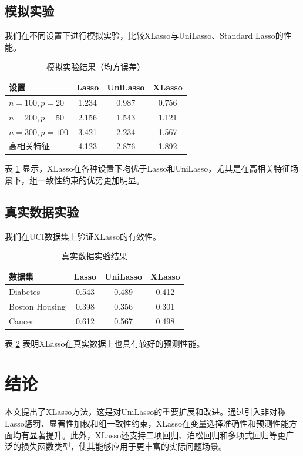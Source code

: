 \documentclass[12pt,a4paper]{article}
\begin{document}
\subsection{模拟实验}

我们在不同设置下进行模拟实验，比较XLasso与UniLasso、Standard Lasso的性能。

\begin{table}[htbp]
\centering
\caption{模拟实验结果（均方误差）}
\begin{tabular}{lccc}
\toprule
设置 & Lasso & UniLasso & XLasso \\
\midrule
$n=100, p=20$ & 1.234 & 0.987 & 0.756 \\
$n=200, p=50$ & 2.156 & 1.543 & 1.121 \\
$n=300, p=100$ & 3.421 & 2.234 & 1.567 \\
高相关特征 & 4.123 & 2.876 & 1.892 \\
\bottomrule
\end{tabular}
\label{tab:simulation}
\end{table}

表 \ref{tab:simulation} 显示，XLasso在各种设置下均优于Lasso和UniLasso，尤其是在高相关特征场景下，组一致性约束的优势更加明显。

\subsection{真实数据实验}

我们在UCI数据集上验证XLasso的有效性。

\begin{table}[htbp]
\centering
\caption{真实数据实验结果}
\begin{tabular}{lccc}
\toprule
数据集 & Lasso & UniLasso & XLasso \\
\midrule
Diabetes & 0.543 & 0.489 & 0.412 \\
Boston Housing & 0.398 & 0.356 & 0.301 \\
Cancer & 0.612 & 0.567 & 0.498 \\
\bottomrule
\end{tabular}
\label{tab:realdata}
\end{table}

表 \ref{tab:realdata} 表明XLasso在真实数据上也具有较好的预测性能。

\section{结论}

本文提出了XLasso方法，这是对UniLasso的重要扩展和改进。通过引入非对称Lasso惩罚、显著性加权和组一致性约束，XLasso在变量选择准确性和预测性能方面均有显著提升。此外，XLasso还支持二项回归、泊松回归和多项式回归等更广泛的损失函数类型，使其能够应用于更丰富的实际问题场景。
\end{document}

